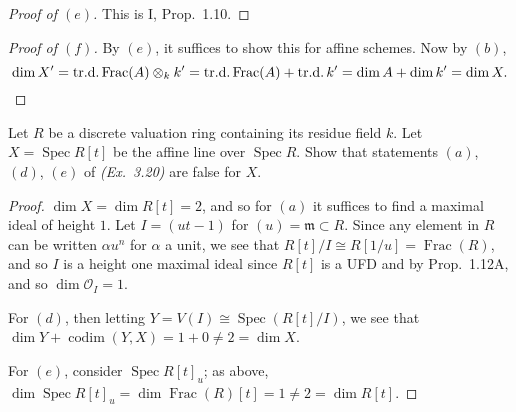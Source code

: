 \documentclass[10pt]{article}
\theoremstyle{definition}
\theoremstyle{remark}
\numberwithin{equation}{section}
\numberwithin{figure}{subsubsection}
\DeclareMathOperator{\Spec}{Spec}
\DeclareMathOperator{\Frac}{Frac}
\DeclareMathOperator{\codim}{codim}
\DeclareMathOperator{\trd}{tr.d.}
\newcommand{\OO}{\mathcal{O}}
\begin{document}
\begin{proof}[Proof of $(e)$]
  This is I, Prop.~1.10.
\end{proof}
\begin{proof}[Proof of $(f)$]
  By $(e)$, it suffices to show this for affine schemes. Now by $(b)$,
  \[\dim X' = \trd \Frac(A) \otimes_k k' = \trd \Frac(A) + \trd k' = \dim A +
  \dim k' = \dim X.\qedhere\]
\end{proof}

\begin{problem}
  Let $R$ be a discrete valuation ring containing its residue field $k$. Let $X = \Spec R[t]$ be the affine line over $\Spec R$. Show that statements $(a)$, $(d)$, $(e)$ of \emph{(Ex.~3.20)} are false for $X$.
\end{problem}
\begin{proof}
  $\dim X = \dim R[t] = 2$, and so for $(a)$ it suffices to find a maximal ideal of height $1$. Let $I = (ut-1)$ for $(u) = \mathfrak{m} \subset R$. Since any element in $R$ can be written $\alpha u^n$ for $\alpha$ a unit, we see that $R[t]/I \cong R[1/u] = \Frac(R)$, and so $I$ is a height one maximal ideal since $R[t]$ is a UFD and by Prop.~1.12A, and so $\dim \OO_I =1$.
  \par For $(d)$, then letting $Y = V(I) \cong \Spec(R[t]/I)$, we see that $\dim Y + \codim(Y,X) = 1 + 0 \ne 2 = \dim X$.
  \par For $(e)$, consider $\Spec R[t]_u$; as above, $\dim \Spec R[t]_u = \dim \Frac(R)[t] = 1 \ne 2 = \dim R[t]$.
\end{proof}
\end{document}
